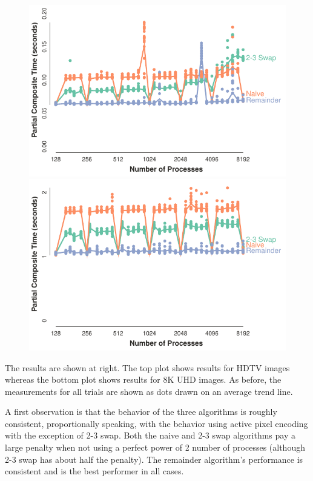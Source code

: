 \documentclass{vgtc}                          %
\newcommand*{\textalgorithm}[1]{\textsf{#1}\xspace}
\newcommand{\ttswap}{\textalgorithm{2-3 swap}}
\newcommand{\naive}{\textalgorithm{naive}}
\newcommand{\remainder}{\textalgorithm{remainder}}
\begin{document}
\begin{figure}
  \includegraphics[width=\linewidth]{no-compress-hdtv}
  \includegraphics[width=\linewidth]{no-compress-8k}
\end{figure}
The results are shown at right.
The top plot shows results for HDTV images whereas the bottom plot shows results for 8K UHD images.
As before, the measurements for all trials are shown as dots drawn on an average trend line.

A first observation is that the behavior of the three algorithms is roughly consistent, proportionally speaking, with the behavior using active pixel encoding with the exception of \ttswap.
Both the \naive and \ttswap algorithms pay a large penalty when not using a perfect power of 2 number of processes (although \ttswap has about half the penalty).
The \remainder algorithm's performance is consistent and is the best performer in all cases.
\end{document}
